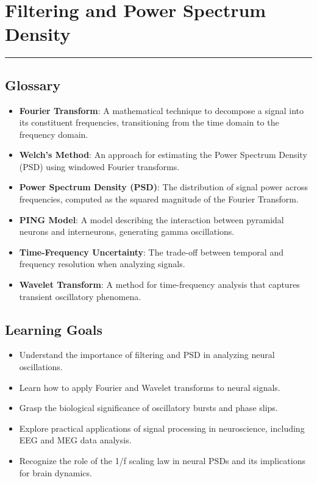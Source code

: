 
\chapter{Filtering and Power Spectrum Density}

\rule{\linewidth}{0.4pt} %

\section*{Glossary}
\begin{itemize}
\item \textbf{Fourier Transform}: A mathematical technique to decompose a signal into its constituent frequencies, transitioning from the time domain to the frequency domain.
\item \textbf{Welch's Method}: An approach for estimating the Power Spectrum Density (PSD) using windowed Fourier transforms.
\item \textbf{Power Spectrum Density (PSD)}: The distribution of signal power across frequencies, computed as the squared magnitude of the Fourier Transform.
\item \textbf{PING Model}: A model describing the interaction between pyramidal neurons and interneurons, generating gamma oscillations.
\item \textbf{Time-Frequency Uncertainty}: The trade-off between temporal and frequency resolution when analyzing signals.
\item \textbf{Wavelet Transform}: A method for time-frequency analysis that captures transient oscillatory phenomena.
\end{itemize}

\section*{Learning Goals}
\begin{itemize}
\item Understand the importance of filtering and PSD in analyzing neural oscillations.
\item Learn how to apply Fourier and Wavelet transforms to neural signals.
\item Grasp the biological significance of oscillatory bursts and phase slips.
\item Explore practical applications of signal processing in neuroscience, including EEG and MEG data analysis.
\item Recognize the role of the 1/f scaling law in neural PSDs and its implications for brain dynamics.
\end{itemize}

